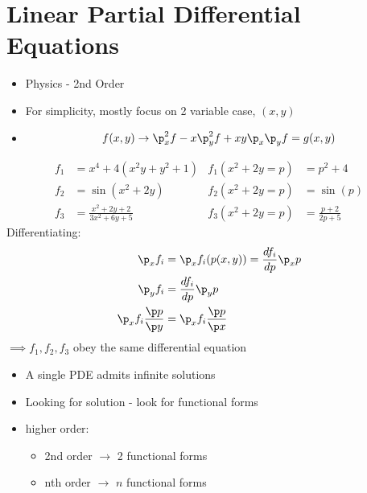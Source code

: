 \documentclass[Maths.tex]{subfiles}
\begin{document}
\section{Linear Partial Differential Equations}
\begin{itemize}
	\item Physics - 2nd Order
	\item For simplicity, mostly focus on 2 variable case, $(x,y)$
	\item
	\begin{equation}
		f(x,y) \to \p_x^2f - x\p_y^2f + xy\p_x\p_yf = g(x,y)
	\end{equation}
\end{itemize}

\begin{example}
\begin{align}
	f_1 &= x^4 + 4(x^2y + y^2 + 1) & f_1(x^2+2y = p) &= p^2 + 4 \\
	f_2 &= \sin(x^2 + 2y) & f_2(x^2+2y = p) &= \sin(p) \\
	f_3 &= \frac{x^2 + 2y + 2}{3x^2 + 6y + 5} & f_3(x^2+2y=p) &= \frac{p+2}{2p+5}
\end{align}
Differentiating:
\begin{align}
	\p_xf_i &= \p_xf_i(p(x,y)) = \frac{df_i}{dp}\p_xp \\
	\p_yf_i &= \frac{df_i}{dp}\p_y p \\
	\p_xf_i\frac{\p p}{\p y} &= \p_xf_i \frac{\p p}{\p x}
\end{align}
$\implies f_1,f_2,f_3$ obey the same differential equation
\end{example}

\begin{itemize}
	\item A single PDE admits infinite solutions
	\item Looking for solution - look for functional forms
	\item higher order:
	\begin{itemize}
		\item 2nd order $\to$ 2 functional forms
		\item nth order $\to$ $n$ functional forms
	\end{itemize}
\end{itemize}
\end{document}
